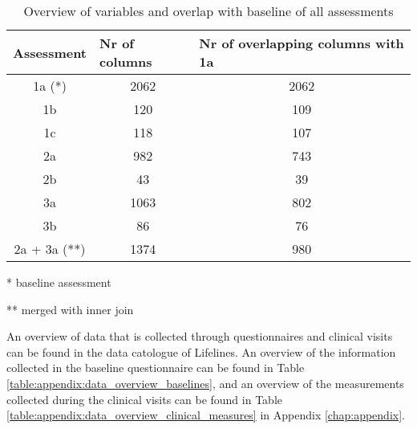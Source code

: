 \vspace{0.5cm}
\begin{table} [H]
    \centering
    \caption{Overview of variables and overlap with baseline of all assessments}
    \begin{tabular}{ccc}
        \hline
        \multicolumn{1}{l}{Assessment} & \multicolumn{1}{l}{Nr of columns} & \multicolumn{1}{l}{Nr of overlapping columns with 1a} \\ \hline
        1a (*)                         & 2062                              & 2062                                                                      \\
        1b                             & 120                               & 109                                                                       \\
        1c                             & 118                               & 107                                                                       \\
        2a                             & 982                               & 743                                                                       \\
        2b                             & 43                                & 39                                                                        \\
        3a                             & 1063                              & 802                                                                       \\
        3b                             & 86                                & 76                                                                        \\
        2a + 3a (**)                       & 1374                              & 980                                 
    \end{tabular}
    \begin{tablenotes}
        \small
        \item \hspace{1cm} * baseline assessment
        \item \hspace{1cm} ** merged with inner join
      \end{tablenotes}
    \label{table:data:variable_overview_before_preprocessing}
\end{table}

An overview of data that is collected through questionnaires and clinical visits can be found in the data catologue of Lifelines. An overview of the information collected in the baseline questionnaire can be found in Table \ref{table:appendix:data_overview_baselines}, and an overview of the measurements collected during the clinical visits can be found in Table \ref{table:appendix:data_overview_clinical_measures} in Appendix \ref{chap:appendix}. %

